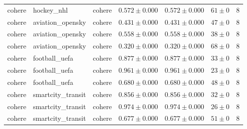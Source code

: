 \begin{table}[htbp]
\begin{tabular}{l l l r r r r}
cohere & hockey\_nhl & cohere & $0.572\pm0.000$ & $0.572\pm0.000$ & $61\pm0$ & 8 \\
cohere & aviation\_opensky & cohere & $0.431\pm0.000$ & $0.431\pm0.000$ & $47\pm0$ & 8 \\
cohere & aviation\_opensky & cohere & $0.558\pm0.000$ & $0.558\pm0.000$ & $38\pm0$ & 8 \\
cohere & aviation\_opensky & cohere & $0.320\pm0.000$ & $0.320\pm0.000$ & $68\pm0$ & 8 \\
cohere & football\_uefa & cohere & $0.877\pm0.000$ & $0.877\pm0.000$ & $33\pm0$ & 8 \\
cohere & football\_uefa & cohere & $0.961\pm0.000$ & $0.961\pm0.000$ & $23\pm0$ & 8 \\
cohere & football\_uefa & cohere & $0.680\pm0.000$ & $0.680\pm0.000$ & $48\pm0$ & 8 \\
cohere & smartcity\_transit & cohere & $0.856\pm0.000$ & $0.856\pm0.000$ & $32\pm0$ & 8 \\
cohere & smartcity\_transit & cohere & $0.974\pm0.000$ & $0.974\pm0.000$ & $26\pm0$ & 8 \\
cohere & smartcity\_transit & cohere & $0.677\pm0.000$ & $0.677\pm0.000$ & $51\pm0$ & 8 \\
\hline
\end{tabular}
\end{table}
